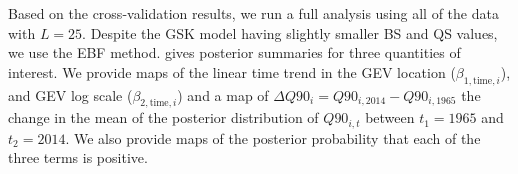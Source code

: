 



Based on the cross-validation results, we run a full analysis using all of the data with $L = 25$.
Despite the GSK model having slightly smaller BS and QS values, we use the EBF method.
 gives posterior summaries for three quantities of interest.
We provide maps of the linear time trend in the GEV location ($\beta_{1, \text{time}, i}$), and GEV log scale  ($\beta_{2, \text{time}, i}$)  and a map of \mbox{$\Delta Q90_i = Q90_{i, 2014} - Q90_{i, 1965}$} the change in the mean of the posterior distribution of $Q90_{i, t}$ between $t_1 = 1965$ and $t_2 = 2014$.
We also provide maps of the posterior probability that each of the three terms is positive.

